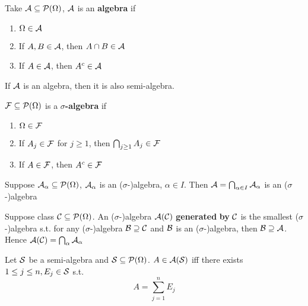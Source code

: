 \documentclass[11pt]{article}
\begin{document}
\begin{definition}[]
Take \(\mathcal{A}\subseteq\mathcal{P}(\Omega)\), \(\mathcal{A}\) is an \textbf{algebra} if
\begin{enumerate}
\item \(\Omega\in\mathcal{A}\)
\item If \(A,B\in\mathcal{A}\), then \(A\cap B\in\mathcal{A}\)
\item If \(A\in\mathcal{A}\), then \(A^c\in\mathcal{A}\)
\end{enumerate}
\end{definition}

If \(\mathcal{A}\) is an algebra, then it is also semi-algebra.

\begin{definition}[]
\(\mathcal{F}\subseteq\mathcal{P}(\Omega)\) is a \textbf{\(\sigma\)-algebra} if
\begin{enumerate}
\item \(\Omega\in\mathcal{F}\)
\item If \(A_j\in\mathcal{F}\) for \(j\ge 1\), then \(\bigcap_{j\ge1}A_j\in\mathcal{F}\)
\item If \(A\in\mathcal{F}\), then \(A^c\in\mathcal{F}\)
\end{enumerate}
\end{definition}

\begin{proposition}[]
Suppose \(\mathcal{A}_\alpha\subseteq\mathcal{P}(\Omega)\), \(\mathcal{A}_\alpha\) is an (\(\sigma\)-)algebra, 
\(\alpha\in I\). Then \(\mathcal{A}=\bigcap_{\alpha\in I}\mathcal{A}_\alpha\) is an (\(\sigma\)-)algebra
\end{proposition}

\begin{definition}[]
Suppose class \(\mathcal{C}\subseteq\mathcal{P}(\Omega)\). An (\(\sigma\)-)algebra \(\mathcal{A}(\mathcal{C})\) \textbf{generated}
\textbf{by} \(\mathcal{C}\) is the smallest (\(\sigma\)-)algebra s.t. for any (\(\sigma\)-)algebra \(\mathcal{B}\supseteq\mathcal{C}\)
and \(\mathcal{B}\) is an (\(\sigma\)-)algebra, then \(\mathcal{B}\supseteq \mathcal{A}\). Hence
\(\mathcal{A}(\mathcal{C})=\bigcap_\alpha \mathcal{A}_\alpha\)
\end{definition}


\begin{lemma}[]
Let \(\mathcal{S}\) be a semi-algebra and \(\mathcal{S}\subseteq\mathcal{P}(\Omega)\).
\(A\in\mathcal{A}(\mathcal{S})\) 
iff there exists \(1\le j\le n,E_j\in\mathcal{S}\) s.t.
\begin{equation*}
A=\displaystyle\sum_{j=1}^nE_j
\end{equation*}
\end{lemma}
\end{document}
